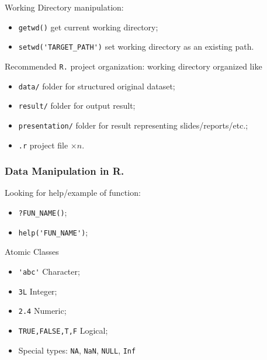 \noindent Working Directory manipulation:
\begin{itemize}[topsep=2pt,itemsep=0pt]
    \item \lstinline|getwd()| get current working directory;
    \item \lstinline|setwd('TARGET_PATH')| set working directory as an existing path.  
\end{itemize}

\noindent Recommended \lstinline|R.| project organization: working directory organized like
\begin{itemize}[topsep=2pt,itemsep=0pt]
    \item \lstinline|data/| folder for structured original dataset;
    \item \lstinline|result/| folder for output result;
    \item \lstinline|presentation/| folder for result representing slides/reports/etc.;
    \item \lstinline|.r| project file $ \times n $.
\end{itemize}



\subsubsection{Data Manipulation in R.}

\begin{point}
    Looking for help/example of function:
\end{point}

\begin{itemize}[topsep=2pt,itemsep=0pt]
    \item \lstinline|?FUN_NAME()|;
    \item \lstinline|help('FUN_NAME')|;
\end{itemize}





\begin{point}
    Atomic Classes
\end{point}
\begin{itemize}[topsep=2pt,itemsep=0pt]
    \item \lstinline|'abc'| Character;
    \item \lstinline|3L| Integer;
    \item \lstinline|2.4| Numeric;
    \item \lstinline|TRUE,FALSE,T,F| Logical;
    \item Special types: \lstinline|NA|, \lstinline|NaN|, \lstinline|NULL|, \lstinline|Inf|
\end{itemize}

